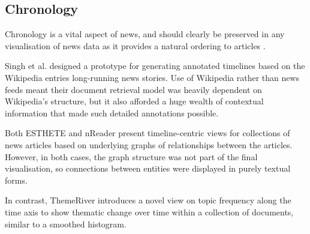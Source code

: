 \subsection{Chronology}
Chronology is a vital aspect of news, and should clearly be preserved in any visualisation of news data as it provides a natural ordering to articles \citep{StructuredSummarizationForNewsEvents}.

Singh et al. \citep{ExploringLongRunningNewsStoriesUsingWikipedia} designed a prototype for generating annotated timelines based on the Wikipedia entries long-running news stories. Use of Wikipedia rather than news feeds meant their document retrieval model was heavily dependent on Wikipedia's structure, but it also afforded a huge wealth of contextual information that made such detailed annotations possible.

Both ESTHETE \citep{ESTHETE} and nReader \citep{Nreader} present timeline-centric views for collections of news articles based on underlying graphs of relationships between the articles. However, in both cases, the graph structure was not part of the final visualisation, so connections between entities were displayed in purely textual forms.

In contrast, ThemeRiver \citep{ThemeRiver} introduces a novel view on topic frequency along the time axis to show thematic change over time within a collection of documents, similar to a smoothed histogram. 


